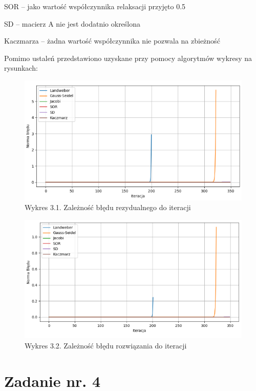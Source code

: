 \documentclass{article}
\begin{document}
SOR – jako wartość współczynnika relaksacji przyjęto 0.5 

SD – macierz A nie jest dodatnio określona 

Kaczmarza – żadna wartość współczynnika nie pozwala na zbieżność 

Pomimo ustaleń przedstawiono uzyskane przy pomocy algorytmów wykresy na rysunkach: 
\begin{figure}[H]
  \includegraphics[width=1.5\textwidth, center]{Rysunek.png}
  \centering
  \captionsetup[Tabela]{name=New Table Name}
  \caption*{Wykres 3.1. Zależność błędu rezydualnego do iteracji}
\end{figure}

\begin{figure}[H]
  \includegraphics[width=1.5\textwidth, center]{Rys.png}
  \centering
  \captionsetup[Tabela]{name=New Table Name}
  \caption*{Wykres 3.2. Zależność błędu rozwiązania do iteracji}
\end{figure}
\newpage
\section{Zadanie nr. 4}
\end{document}
